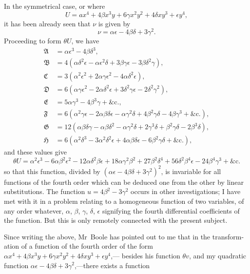\documentclass[11pt,a4paper]{article}
\theoremstyle{plain}
\theoremstyle{definition}
\theoremstyle{remark}
\begin{document}
In the symmetrical case, or where
\[
U = ax^4 + 4\beta x^3y + 6\gamma x^2y^2 + 4\delta xy^3 + \epsilon y^4,
\]
it has been already seen that $\nu$ is given by
\[
\nu = \alpha\epsilon - 4\beta\delta + 3\gamma^2.
\]
Proceeding to form $\theta U$, we have
\begin{align*}
\mathfrak{A} &= \alpha\epsilon^3 - 4\beta\delta^3, \\
\mathfrak{B} &= 4(\alpha\delta^2\epsilon - \alpha\epsilon^2\delta + 3\beta\gamma\epsilon - 3\beta\delta^2\gamma), \\
\mathfrak{C} &= 3(\alpha^2\epsilon^2 + 2\alpha\gamma\epsilon^2 - 4\alpha\delta^2\epsilon), \\
\mathfrak{D} &= 6(\alpha\gamma\epsilon^2 - 2\alpha\delta^2\epsilon + 3\delta^2\gamma\epsilon - 2\delta^2\gamma^2), \\
\mathfrak{E} &= 5\alpha\gamma^3 - 4\beta^3\gamma + \&\text{c.}, \\
\mathfrak{F} &= 6(\alpha^2\gamma\epsilon - 2\alpha\beta\delta\epsilon - \alpha\gamma^2\delta + 4\beta^2\gamma\delta - 4\beta\gamma^3 + \&\text{c.}), \\
\mathfrak{G} &= 12(\alpha\beta\delta\gamma - \alpha\beta\delta^2 - \alpha\gamma^2\delta + 2\gamma^3\delta + \beta^2\gamma\delta - 2\beta^3\delta), \\
\mathfrak{H} &= 6(\alpha^2\delta^3 - 3\alpha^2\delta^2\epsilon + 4\alpha\beta\delta\epsilon - 6\beta^2\gamma\delta + \&\text{c.}),
\end{align*}
and these values give
\[
\theta U = \alpha^2\epsilon^3 - 6\alpha\beta^2\epsilon^2 - 12\alpha\delta^2\beta\epsilon + 18\alpha\gamma^2\beta^2 + 27\beta^2\delta^4 + 56\delta^2\beta^4\epsilon
- 24\beta^4\gamma^3 + \&\text{c.}
\]
so that this function, divided by $(\alpha\epsilon - 4\beta\delta + 3\gamma^2)^2$, is invariable for all functions of the
fourth order which can be deduced one from the other by linear substitutions. The
function $u = 4\beta^2 - 3\gamma^2$ occurs in other investigations; I have met with it in a problem
relating to a homogeneous function of two variables, of any order whatever, $\alpha$, $\beta$, $\gamma$, $\delta$, $\epsilon$
signifying the fourth differential coefficients of the function. But this is only remotely
connected with the present subject.

Since writing the above, Mr~Boole has pointed out to me that in the transform-
ation of a function of the fourth order of the form $\alpha x^4 + 4\beta x^3y + 6\gamma x^2y^2 + 4\delta xy^3 + \epsilon y^4$,---
besides his function $\theta v$, and my quadratic function $\alpha\epsilon - 4\beta\delta + 3\gamma^2$,---there exists a function
\end{document}
